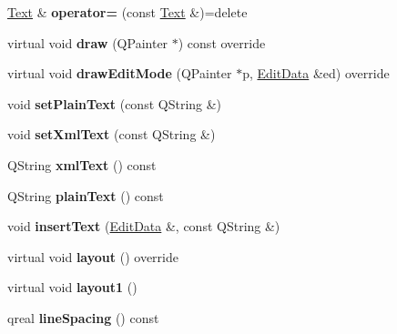\begin{DoxyCompactItemize}
\hyperlink{class_ms_1_1_text}{Text} \& {\bfseries operator=} (const \hyperlink{class_ms_1_1_text}{Text} \&)=delete
\item 
\mbox{\label{class_ms_1_1_text_a997e0d9ea5491ebed868658dac1c2031}} 
virtual void {\bfseries draw} (Q\+Painter $\ast$) const override
\item 
\mbox{\label{class_ms_1_1_text_a4daaf0e1c26ea00e69f4d9d540699b98}} 
virtual void {\bfseries draw\+Edit\+Mode} (Q\+Painter $\ast$p, \hyperlink{class_ms_1_1_edit_data}{Edit\+Data} \&ed) override
\item 
\mbox{\label{class_ms_1_1_text_a869c3df4575ee82569ca1c1b7600a281}} 
void {\bfseries set\+Plain\+Text} (const Q\+String \&)
\item 
\mbox{\label{class_ms_1_1_text_a6c145fa9a5ab5b60ae315c2977b5facd}} 
void {\bfseries set\+Xml\+Text} (const Q\+String \&)
\item 
\mbox{\label{class_ms_1_1_text_a3485d9a6d8a6157ac40f12feb6f9d77c}} 
Q\+String {\bfseries xml\+Text} () const
\item 
\mbox{\label{class_ms_1_1_text_a3d2ab51f5aa77dd995826445a88ce77b}} 
Q\+String {\bfseries plain\+Text} () const
\item 
\mbox{\label{class_ms_1_1_text_a57eb1d743d933260fdd103495b3d48f6}} 
void {\bfseries insert\+Text} (\hyperlink{class_ms_1_1_edit_data}{Edit\+Data} \&, const Q\+String \&)
\item 
\mbox{\label{class_ms_1_1_text_aad7c89f15ada4231acb0484c6c98078a}} 
virtual void {\bfseries layout} () override
\item 
\mbox{\label{class_ms_1_1_text_a037c2b10fa49eb6c1f3a04a60357a4bb}} 
virtual void {\bfseries layout1} ()
\item 
\mbox{\label{class_ms_1_1_text_a9dc634419131df2fae8d5643b75e5ef2}} 
qreal {\bfseries line\+Spacing} () const
\item 
\mbox{\label{class_ms_1_1_text_a36b8c63ece920d7d8362881b9df58894}} 

\end{DoxyCompactItemize}
